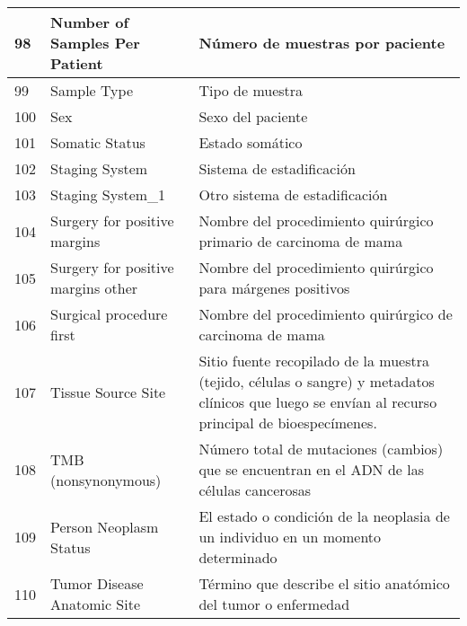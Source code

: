 \begin{table*} [!htb]
\begin{threeparttable}
\begin{tabular}{p{1cm} p{4cm} p{10cm}}
			\\ \hline	98	&	Number of Samples Per Patient	&	Número de muestras por paciente
			\\ \hline	99	&	Sample Type	&	Tipo de muestra
			\\ \hline	100	&	Sex	&	Sexo del paciente
			\\ \hline	101	&	Somatic Status	&	Estado somático
			\\ \hline	102	&	Staging System	&	Sistema de estadificación
			\\ \hline	103	&	Staging System\_1	&	Otro sistema de estadificación
			\\ \hline	104	&	Surgery for positive margins	&	Nombre del procedimiento quirúrgico primario de carcinoma de mama
			\\ \hline	105	&	Surgery for positive margins other	&	Nombre del procedimiento quirúrgico para márgenes positivos
			\\ \hline	106	&	Surgical procedure first	&	Nombre del procedimiento quirúrgico de carcinoma de mama
			\\ \hline	107	&	Tissue Source Site	&	Sitio fuente recopilado de la muestra (tejido, células o sangre) y metadatos clínicos que luego se envían al recurso principal de bioespecímenes.
			\\ \hline	108	&	TMB (nonsynonymous)	&	Número total de mutaciones (cambios) que se encuentran en el ADN de las células cancerosas
			\\ \hline	109	&	Person Neoplasm Status	&	El estado o condición de la neoplasia de un individuo en un momento determinado
			\\ \hline	110	&	Tumor Disease Anatomic Site	&	Término que describe el sitio anatómico del tumor o enfermedad
			\\ \hline
		\end{tabular}
	\end{threeparttable}
\end{table*}

